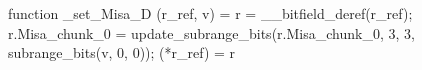 function _set_Misa_D (r_ref, v) = {
    r = __bitfield_deref(r_ref);
    r.Misa_chunk_0 = update_subrange_bits(r.Misa_chunk_0, 3, 3, subrange_bits(v, 0, 0));
    (*r_ref) = r
}
